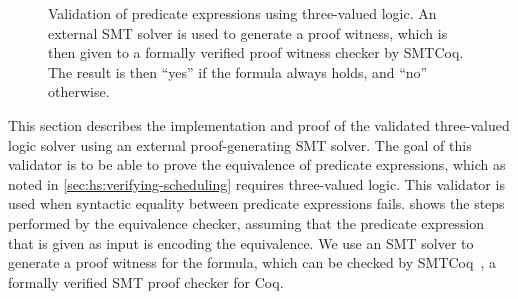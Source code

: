 {\begin{figure}
  \centering
  \caption[Validation of predicate expressions using three-valued logic.]{Validation
    of predicate expressions using three-valued logic.  An external SMT solver is
    used to generate a proof witness, which is then given to a formally verified
    proof witness checker by SMTCoq.  The result is then \enquote{yes} if the
    formula always holds, and \enquote{no} otherwise.}%
  \label{fig:hs:validated-three-valued-logic}
\end{figure}

This section describes the implementation and proof of the validated three-valued
logic solver using an external proof-generating SMT solver.  The goal of this
validator is to be able to prove the equivalence of predicate expressions, which
as noted in \cref{sec:hs:verifying-scheduling} requires three-valued logic.
This validator is used when syntactic equality between predicate expressions fails.
 shows the steps performed by the
equivalence checker, assuming that the predicate expression that is given as
input is encoding the equivalence.  We use an SMT solver to generate a proof
witness for the formula, which can be checked by
SMTCoq~\cite{armand11_modul_integ_sat_smt_solver,ekici17_smtcoq}, a formally
verified SMT proof checker for Coq.

}
